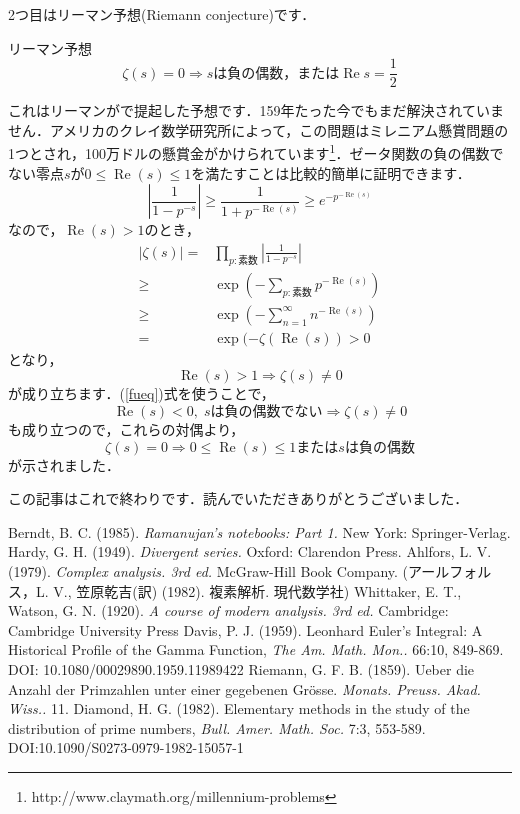 \documentclass[./main]{subfile}
\begin{document}
2つ目はリーマン予想(Riemann conjecture)です．
\begin{itembox}[l]{リーマン予想}
\[
\zeta(s)=0\Rightarrow s\text{は負の偶数，または}\operatorname{Re}s=\frac{1}{2}
\]
\end{itembox}
これはリーマンが\cite{APG}で提起した予想です．159年たった今でもまだ解決されていません．アメリカのクレイ数学研究所によって，この問題はミレニアム懸賞問題の1つとされ，100万ドルの懸賞金がかけられています\footnote{http://www.claymath.org/millennium-problems}．ゼータ関数の負の偶数でない零点$s$が$0\leq \operatorname{Re}(s)\leq 1$を満たすことは比較的簡単に証明できます．
\[
\left|\frac{1}{1-p^{-s}}\right|\geq \frac{1}{1+p^{-\operatorname{Re}(s)}}\geq e^{-p^{-\operatorname{Re}(s)}}
\]
なので，$\operatorname{Re}(s)>1$のとき，
\begin{align*}
\left|\zeta(s)\right|=&\prod_{p:\text{素数}}\left|\frac{1}{1-p^{-s}}\right|\\
\geq&\exp\left(-\sum_{p:\text{素数}}p^{-\operatorname{Re}(s)}\right)\\
\geq&\exp\left(-\sum_{n=1}^{\infty}n^{-\operatorname{Re}(s)}\right)\\
=&\exp(-\zeta(\operatorname{Re}(s))>0
\end{align*}
となり，
\[
\operatorname{Re}(s)>1\Rightarrow\zeta(s)\neq 0
\]
が成り立ちます．(\ref{fueq})式を使うことで，
\[
\operatorname{Re}(s)<0,\;s\text{は負の偶数でない}\Rightarrow\zeta(s)\neq 0
\]
も成り立つので，これらの対偶より，
\[
\zeta(s)=0\Rightarrow 0\leq\operatorname{Re}(s)\leq 1\text{または}s\text{は負の偶数}
\]
が示されました．\vspace{\baselineskip}

この記事はこれで終わりです．読んでいただきありがとうございました．

\begin{thebibliography}{9}
Berndt, B. C. (1985). {\it Ramanujan's notebooks: Part 1.} New York: Springer-Verlag.
Hardy, G. H. (1949). {\it Divergent series.} Oxford: Clarendon Press.
Ahlfors, L. V. (1979). {\it Complex analysis. 3rd ed.} McGraw-Hill Book Company. (アールフォルス，L. V., 笠原乾吉(訳) (1982). 複素解析. 現代数学社)
Whittaker, E. T., Watson, G. N. (1920). {\it A course of modern analysis. 3rd ed.} Cambridge: Cambridge University Press
 Davis, P. J. (1959). Leonhard Euler's Integral: A Historical Profile of the Gamma Function, {\it The Am. Math. Mon..} 66:10, 849-869. DOI: 10.1080/00029890.1959.11989422
Riemann, G. F. B. (1859). Ueber die Anzahl der Primzahlen unter einer gegebenen Gr\"osse. {\it Monats. Preuss. Akad. Wiss..} 11.
Diamond, H. G. (1982). Elementary methods in the study of the distribution of prime numbers, {\it Bull. Amer. Math. Soc.} 7:3, 553-589. DOI:10.1090/S0273-0979-1982-15057-1
\end{thebibliography}
\end{document}
